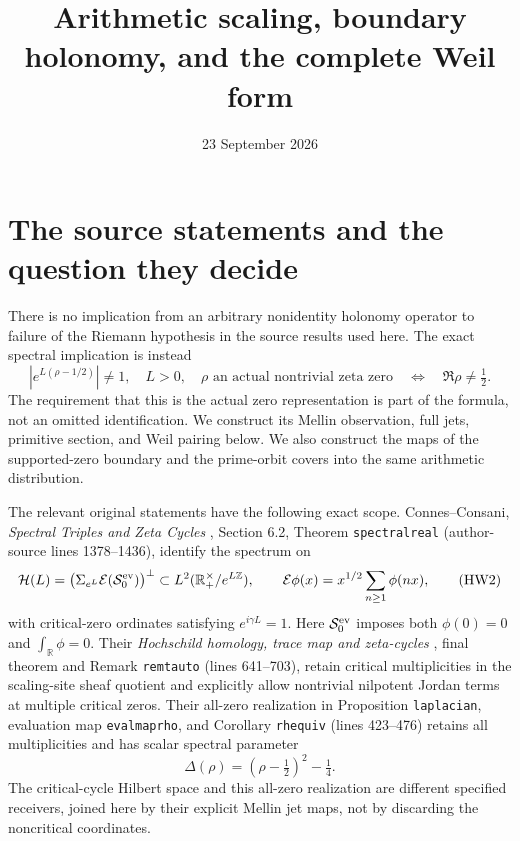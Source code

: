 \documentclass[11pt]{article}
\title{Arithmetic scaling, boundary holonomy, and the complete Weil form}
\author{}
\date{23 September 2026}
\newcommand{\R}{\mathbb R}
\newcommand{\Z}{\mathbb Z}
\begin{document}
\maketitle

\section{The source statements and the question they decide}

There is no implication from an arbitrary nonidentity holonomy
operator to failure of the Riemann hypothesis in the source results
used here. The exact spectral implication is instead
\[
 \left|e^{L(\rho-1/2)}\right|\ne1,\quad L>0,\quad
 \rho\text{ an actual nontrivial zeta zero}
 \quad\Longleftrightarrow\quad \Re\rho\ne\tfrac12.
 \tag{HW1}\label{hw:criterion}
\]
The requirement that this is the actual zero representation is
part of the formula, not an omitted identification. We construct its
Mellin observation, full jets, primitive section, and Weil pairing
below. We also construct the maps of the supported-zero boundary and
the prime-orbit covers into the same arithmetic distribution.

The relevant original statements have the following exact scope.
Connes--Consani, \emph{Spectral Triples and Zeta Cycles}
\cite{CCcycles}, Section 6.2, Theorem \texttt{spectralreal}
(author-source lines 1378--1436), identify the spectrum on
\[
 \mathcal H(L)=
 \bigl(\Sigma_{e^L}\mathcal E(\mathcal S^{\rm ev}_0)\bigr)^\perp
 \subset L^2(\R_+^\times/e^{L\Z}),\qquad
 \mathcal E\phi(x)=x^{1/2}\sum_{n\ge1}\phi(nx),
 \tag{HW2}
\]
with critical-zero ordinates satisfying \(e^{i\gamma L}=1\).
Here \(\mathcal S^{\rm ev}_0\) imposes both
\(\phi(0)=0\) and \(\int_\R\phi=0\).
Their \emph{Hochschild homology, trace map and zeta-cycles}
\cite{CCHH}, final theorem and Remark \texttt{remtauto}
(lines 641--703), retain critical multiplicities in the
scaling-site sheaf quotient and explicitly allow nontrivial
nilpotent Jordan terms at multiple critical zeros.
Their all-zero realization in Proposition \texttt{laplacian},
evaluation map \texttt{evalmaprho}, and Corollary
\texttt{rhequiv} (lines 423--476) retains all multiplicities and
has scalar spectral parameter
\[
 \Delta(\rho)=(\rho-\tfrac12)^2-\tfrac14.
 \tag{HW3}
\]
The critical-cycle Hilbert space and this all-zero realization are
different specified receivers, joined here by their explicit Mellin
jet maps, not by discarding the noncritical coordinates.
\end{document}
